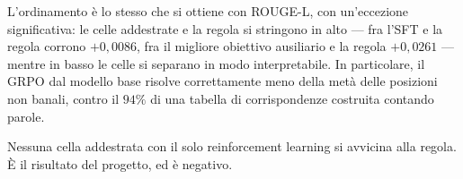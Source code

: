 L'ordinamento è lo stesso che si ottiene con ROUGE-L, con un'eccezione
significativa: le celle addestrate e la regola si stringono in alto --- fra
l'SFT e la regola corrono $+0{,}0086$, fra il migliore obiettivo ausiliario e la
regola $+0{,}0261$ --- mentre in basso le celle si separano in modo
interpretabile. In particolare, il GRPO dal modello base risolve correttamente
meno della metà delle posizioni non banali, contro il $94\%$ di una tabella di
corrispondenze costruita contando parole.

Nessuna cella addestrata con il solo reinforcement learning si avvicina alla
regola. È il risultato del progetto, ed è negativo.

